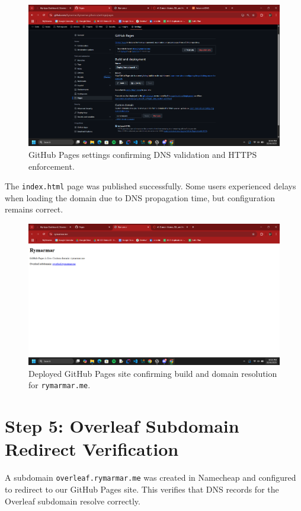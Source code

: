 \begin{figure}[h!]
    \centering
    \includegraphics[width=\textwidth]{png/DomainNames/github settings.png}
    \caption{GitHub Pages settings confirming DNS validation and HTTPS enforcement.}
\end{figure}

The \texttt{index.html} page was published successfully. Some users experienced delays when loading the domain due to DNS propagation time, but configuration remains correct.

\begin{figure}[h!]
    \centering
    \includegraphics[width=\textwidth]{png/DomainNames/website.png}
    \caption{Deployed GitHub Pages site confirming build and domain resolution for \texttt{rymarmar.me}.}
\end{figure}

\section{Step 5: Overleaf Subdomain Redirect Verification}
A subdomain \texttt{overleaf.rymarmar.me} was created in Namecheap and configured to redirect to our GitHub Pages site.  
This verifies that DNS records for the Overleaf subdomain resolve correctly.


